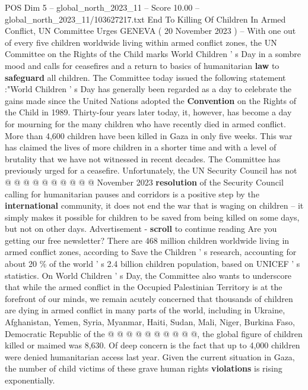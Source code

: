 \begin{textsample}{POS Dim 5 – global\_north\_2023\_11 – Score 10.00 – global\_north\_2023\_11/103627217.txt}  \label{ex:f5_pos_415}
End To Killing Of Children In Armed Conflict, UN Committee Urges GENEVA ( 20 November 2023 ) -- With one out of every five children worldwide living within armed conflict zones, the UN Committee on the Rights of the Child marks World Children ' s Day in a sombre mood and calls for ceasefires and a return to basics of humanitarian \textbf{law} to \textbf{safeguard} all children.
The Committee today issued the following statement :"World Children ' s Day has generally been regarded as a day to celebrate the gains made since the United Nations adopted the \textbf{Convention} on the Rights of the Child in 1989.
Thirty-four years later today, it, however, has become a day for mourning for the many children who have recently died in armed conflict.
More than 4,600 children have been killed in Gaza in only five weeks.
This war has claimed the lives of more children in a shorter time and with a level of brutality that we have not witnessed in recent decades.
The Committee has previously urged for a ceasefire.
Unfortunately, the UN Security Council has not @ @ @ @ @ @ @ @ @ @ November 2023 \textbf{resolution} of the Security Council calling for humanitarian pauses and corridors is a positive step by the \textbf{international} community, it does not end the war that is waging on children -- it simply makes it possible for children to be saved from being killed on some days, but not on other days.
Advertisement - \textbf{scroll} to continue reading Are you getting our free newsletter?
There are 468 million children worldwide living in armed conflict zones, according to Save the Children ' s research, accounting for about 20 \% of the world ' s 2.4 billion children population, based on UNICEF ' s statistics.
On World Children ' s Day, the Committee also wants to underscore that while the armed conflict in the Occupied Palestinian Territory is at the forefront of our minds, we remain acutely concerned that thousands of children are dying in armed conflict in many parts of the world, including in Ukraine, Afghanistan, Yemen, Syria, Myanmar, Haiti, Sudan, Mali, Niger, Burkina Faso, Democratic Republic of the @ @ @ @ @ @ @ @ @ @, the global figure of children killed or maimed was 8,630.
Of deep concern is the fact that up to 4,000 children were denied humanitarian access last year.
Given the current situation in Gaza, the number of child victims of these grave human rights \textbf{violations} is rising exponentially.

\end{textsample}

